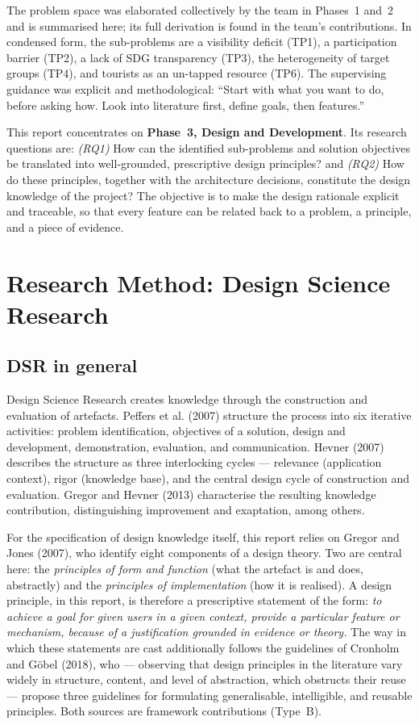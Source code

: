 \documentclass[11pt,a4paper]{article}
\begin{document}
The problem space was elaborated collectively by the team in Phases~1 and~2 and is summarised here; its full derivation is found in the team's contributions. In condensed form, the sub-problems are a visibility deficit (TP1), a participation barrier (TP2), a lack of SDG transparency (TP3), the heterogeneity of target groups (TP4), and tourists as an un-tapped resource (TP6). The supervising guidance was explicit and methodological: ``Start with what you want to do, before asking how. Look into literature first, define goals, then features.''

This report concentrates on \textbf{Phase~3, Design and Development}. Its research questions are: \emph{(RQ1)} How can the identified sub-problems and solution objectives be translated into well-grounded, prescriptive design principles? and \emph{(RQ2)} How do these principles, together with the architecture decisions, constitute the design knowledge of the project? The objective is to make the design rationale explicit and traceable, so that every feature can be related back to a problem, a principle, and a piece of evidence.

\section{Research Method: Design Science Research}

\subsection{DSR in general}

Design Science Research creates knowledge through the construction and evaluation of artefacts. Peffers et al. (2007) structure the process into six iterative activities: problem identification, objectives of a solution, design and development, demonstration, evaluation, and communication. Hevner (2007) describes the structure as three interlocking cycles --- relevance (application context), rigor (knowledge base), and the central design cycle of construction and evaluation. Gregor and Hevner (2013) characterise the resulting knowledge contribution, distinguishing improvement and exaptation, among others.

For the specification of design knowledge itself, this report relies on Gregor and Jones (2007), who identify eight components of a design theory. Two are central here: the \emph{principles of form and function} (what the artefact is and does, abstractly) and the \emph{principles of implementation} (how it is realised). A design principle, in this report, is therefore a prescriptive statement of the form: \emph{to achieve a goal for given users in a given context, provide a particular feature or mechanism, because of a justification grounded in evidence or theory.} The way in which these statements are cast additionally follows the guidelines of Cronholm and G\"obel (2018), who --- observing that design principles in the literature vary widely in structure, content, and level of abstraction, which obstructs their reuse --- propose three guidelines for formulating generalisable, intelligible, and reusable principles. Both sources are framework contributions (Type~B).
\end{document}
